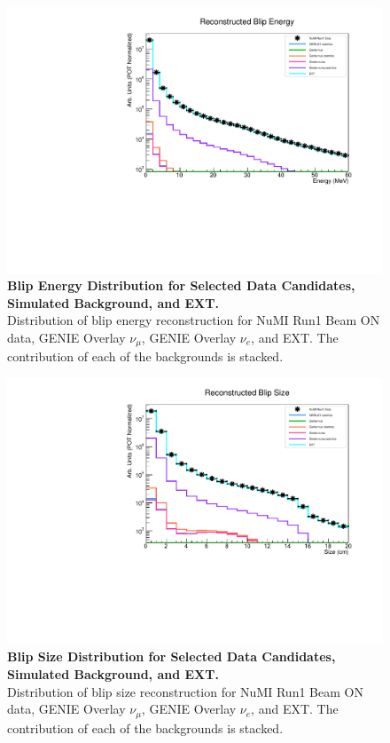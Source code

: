 \begin{figure}[h!]
    \centering
    \includegraphics[width=120mm]{Figures/energy.pdf}
    \caption[Blip Energy Distribution for Selected Data Candidates, Simulated Background, and EXT.]{{\textbf{Blip Energy Distribution for Selected Data Candidates, Simulated Background, and EXT.}}\\ Distribution of blip energy reconstruction for NuMI Run1 Beam ON data, GENIE Overlay $\nu_{\mu}$, GENIE Overlay $\nu_{e}$, and EXT. The contribution of each of the backgrounds is stacked.}
    \label{data_mc_energy}
\end{figure}

\begin{figure}[h!]
    \centering
    \includegraphics[width=120mm]{Figures/size.pdf}
    \caption[Blip Size Distribution for Selected Data Candidates, Simulated Background, and EXT.]{{\textbf{Blip Size Distribution for Selected Data Candidates, Simulated Background, and EXT.}}\\ Distribution of blip size reconstruction for NuMI Run1 Beam ON data, GENIE Overlay $\nu_{\mu}$, GENIE Overlay $\nu_{e}$, and EXT. The contribution of each of the backgrounds is stacked.}
    \label{data_mc_size}
\end{figure}

